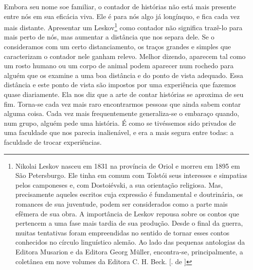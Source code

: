 Embora seu nome soe familiar, o contador de histórias não está mais
presente entre nós em sua eficácia viva. Ele é para nós algo já
longínquo, e fica cada vez mais distante. Apresentar um Leskov\footnote{Nikolai
  Leskov nasceu em 1831 na província de Oriol e morreu em 1895 em São
  Petersburgo. Ele tinha em comum com Tolstói seus interesses e
  simpatias pelos camponeses e, com Dostoiévski, a sua orientação
  religiosa. Mas, precisamente aqueles escritos cuja expressão é
  fundamental e doutrinária, os romances de sua juventude, podem ser
  considerados como a parte mais efêmera de sua obra. A importância de
  Leskov repousa sobre os contos que pertencem a uma fase mais tardia de
  sua produção. Desde o final da guerra, muitas tentativas foram
  empreendidas no sentido de tornar esses contos conhecidos no círculo
  linguístico alemão. Ao lado das pequenas antologias da Editora
  Musarion e da Editora Georg Müller, encontra-se, principalmente, a
  coletânea em nove volumes da Editora C. H. Beck. [. de ]}
como contador não significa trazê-lo para mais perto de nós, mas
aumentar a distância que nos separa dele. Se o consideramos com um certo
distanciamento, os traços grandes e simples que caracterizam o contador
nele ganham relevo. Melhor dizendo, aparecem tal como um rosto humano ou
um corpo de animal podem aparecer num rochedo para alguém que os examine
a uma boa distância e do ponto de vista adequado. Essa distância e este
ponto de vista são impostos por uma experiência que fazemos quase
diariamente. Ela nos diz que a arte de contar histórias se aproxima de
seu fim. Torna-se cada vez mais raro encontrarmos pessoas que ainda
sabem contar alguma coisa. Cada vez mais frequentemente generaliza-se o
embaraço quando, num grupo, alguém pede uma história. É como se
tivéssemos sido privados de uma faculdade que nos parecia inalienável, e
era a mais segura entre todas: a faculdade de trocar experiências.

